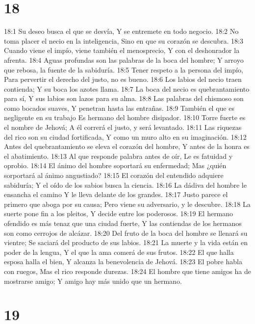 \chapter{18}


18:1 Su deseo busca el que se desvía,  
Y se entremete en todo negocio.  
18:2 No toma placer el necio en la inteligencia,  
Sino en que su corazón se descubra.  
18:3 Cuando viene el impío, viene también el menosprecio,  
Y con el deshonrador la afrenta.  
18:4 Aguas profundas son las palabras de la boca del hombre;  
Y arroyo que rebosa, la fuente de la sabiduría.  
18:5 Tener respeto a la persona del impío,  
Para pervertir el derecho del justo, no es bueno.  
18:6 Los labios del necio traen contienda; 
Y su boca los azotes llama.  
18:7 La boca del necio es quebrantamiento para sí,  
Y sus labios son lazos para su alma.  
18:8 Las palabras del chismoso son como bocados suaves,  
Y penetran hasta las entrañas.  
18:9 También el que es negligente en su trabajo  
Es hermano del hombre disipador.  
18:10 Torre fuerte es el nombre de Jehová;  
A él correrá el justo, y será levantado.  
18:11 Las riquezas del rico son su ciudad fortificada,  
Y como un muro alto en su imaginación.  
18:12 Antes del quebrantamiento se eleva el corazón del hombre,  
Y antes de la honra es el abatimiento.  
18:13 Al que responde palabra antes de oír,  
Le es fatuidad y oprobio.  
18:14 El ánimo del hombre soportará su enfermedad;  
Mas ¿quién sorportará al ánimo angustiado?  
18:15 El corazón del entendido adquiere sabiduría;  
Y el oído de los sabios busca la ciencia.  
18:16 La dádiva del hombre le ensancha el camino  
Y le lleva delante de los grandes.  
18:17 Justo parece el primero que aboga por su causa;  
Pero viene su adversario, y le descubre.  
18:18 La suerte pone fin a los pleitos,  
Y decide entre los poderosos.  
18:19 El hermano ofendido es más tenaz que una ciudad fuerte,  
Y las contiendas de los hermanos son como cerrojos de alcázar.  
18:20 Del fruto de la boca del hombre se llenará su vientre;  
Se saciará del producto de sus labios.  
18:21 La muerte y la vida están en poder de la lengua,  
Y el que la ama comerá de sus frutos.  
18:22 El que halla esposa halla el bien,  
Y alcanza la benevolencia de Jehová.  
18:23 El pobre habla con ruegos,  
Mas el rico responde durezas.  
18:24 El hombre que tiene amigos ha de mostrarse amigo;  
Y amigo hay más unido que un hermano.  

\chapter{19}


